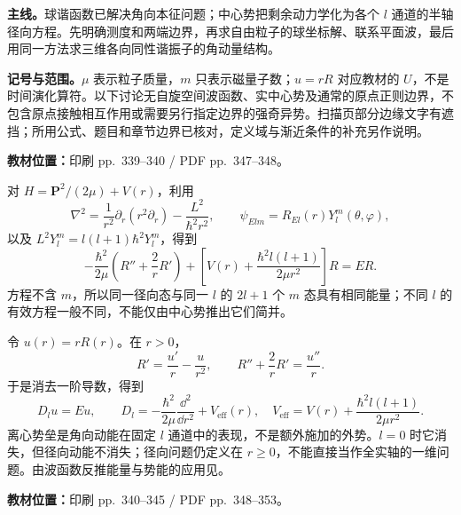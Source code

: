 \textbf{主线。}球谐函数已解决角向本征问题；中心势把剩余动力学化为各个 $l$ 通道的半轴径向方程。先明确测度和两端边界，再求自由粒子的球坐标解、联系平面波，最后用同一方法求三维各向同性谐振子的角动量结构。

\textbf{记号与范围。}$\mu$ 表示粒子质量，$m$ 只表示磁量子数；$u=rR$ 对应教材的 $U$，不是时间演化算符。以下讨论无自旋空间波函数、实中心势及通常的原点正则边界，不包含原点接触相互作用或需要另行指定边界的强奇异势。扫描页部分边缘文字有遮挡；所用公式、题目和章节边界已核对，定义域与渐近条件的补充另作说明。

\textbf{教材位置：}印刷 pp.~339--340 / PDF pp.~347--348。

对 $H=\mathbf P^2/(2\mu)+V(r)$，利用
\begin{equation}
  \nabla^2=\frac1{r^2}\partial_r(r^2\partial_r)
    -\frac{L^2}{\hbar^2r^2},\qquad
  \psi_{Elm}=R_{El}(r)Y_l^m(\theta,\varphi),
\end{equation}
以及 $L^2Y_l^m=l(l+1)\hbar^2Y_l^m$，得到
\begin{equation}
  -\frac{\hbar^2}{2\mu}\left(R''+\frac2rR'\right)
   +\left[V(r)+\frac{\hbar^2l(l+1)}{2\mu r^2}\right]R=ER.
\end{equation}
方程不含 $m$，所以同一径向态与同一 $l$ 的 $2l+1$ 个 $m$ 态具有相同能量；不同 $l$ 的有效方程一般不同，不能仅由中心势推出它们简并。

令 $u(r)=rR(r)$。在 $r>0$，
\begin{equation}
  R'=\frac{u'}r-\frac{u}{r^2},\qquad
  R''+\frac2rR'=\frac{u''}r.
\end{equation}
于是消去一阶导数，得到
\begin{equation}
  \boxed{D_lu=Eu,\qquad
  D_l=-\frac{\hbar^2}{2\mu}\frac{\dd^2}{\dd r^2}+V_{\mathrm{eff}}(r),
  \quad V_{\mathrm{eff}}=V(r)+\frac{\hbar^2l(l+1)}{2\mu r^2}.}
  \label{eq:QM-C12-S06-radial}
\end{equation}
离心势垒是角向动能在固定 $l$ 通道中的表现，不是额外施加的外势。$l=0$ 时它消失，但径向动能不消失；径向问题仍定义在 $r\geq0$，不能直接当作全实轴的一维问题。由波函数反推能量与势能的应用见。

\textbf{教材位置：}印刷 pp.~340--345 / PDF pp.~348--353。

